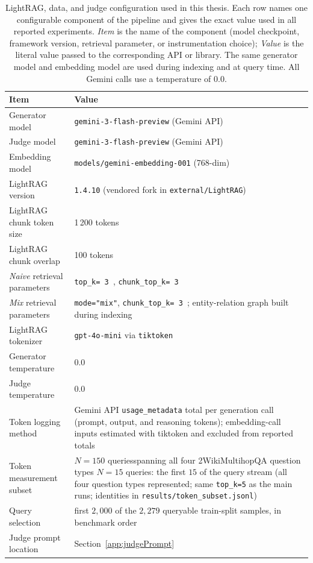\documentclass[english, bibtex]{kththesis}               %
\numberwithin{listing}{chapter}
\providecommand{\DIFaddtex}[1]{{\protect\color{blue} \sf #1}} %
\providecommand{\DIFdeltex}[1]{{\protect\color{red} \scriptsize #1}} %
\providecommand{\DIFaddFL}[1]{\DIFadd{#1}} %
\providecommand{\DIFdelFL}[1]{\DIFdel{#1}} %
\providecommand{\DIFaddbeginFL}{} %
\providecommand{\DIFaddendFL}{} %
\providecommand{\DIFdelbeginFL}{} %
\providecommand{\DIFdelendFL}{} %
\providecommand{\DIFadd}[1]{\texorpdfstring{\DIFaddtex{#1}}{#1}} %
\providecommand{\DIFdel}[1]{\texorpdfstring{\DIFdeltex{#1}}{}} %
\begin{document}
\begin{table}[!ht]
\centering
\caption{LightRAG, data, and judge configuration used in this thesis. Each row names one configurable component of the pipeline and gives the exact value used in all reported experiments. \emph{Item} is the name of the component (model checkpoint, framework version, retrieval parameter, or instrumentation choice); \emph{Value} is the literal value passed to the corresponding API or library. The same generator model and embedding model are used during indexing and at query time. All Gemini calls use a temperature of $0.0$.}
\label{tab:lightragDataJudgeConfig}
\begin{tabularx}{\textwidth}{p{}|X}
\textbf{Item} & \textbf{Value} \\
\hline
Generator model & \texttt{gemini-3-flash-preview} (Gemini API) \\
Judge model & \texttt{gemini-3-flash-preview} (Gemini API) \\
Embedding model & \texttt{models/gemini-embedding-001} (768-dim) \\
LightRAG version & \texttt{1.4.10} (vendored fork in \texttt{external/LightRAG}) \\
LightRAG chunk token size & 1\,200 tokens \\
LightRAG chunk overlap & 100 tokens \\
\emph{Naive} retrieval parameters & \texttt{top\_k=\DIFdelbeginFL \DIFdelFL{3}\DIFdelendFL \DIFaddbeginFL \DIFaddFL{5}\DIFaddendFL }, \texttt{chunk\_top\_k=\DIFdelbeginFL \DIFdelFL{3}\DIFdelendFL \DIFaddbeginFL \DIFaddFL{5}\DIFaddendFL } \\
\emph{Mix} retrieval parameters & \texttt{mode="mix"}, \texttt{chunk\_top\_k=\DIFdelbeginFL \DIFdelFL{3}\DIFdelendFL \DIFaddbeginFL \DIFaddFL{5}\DIFaddendFL }; entity-relation graph built during indexing \\
LightRAG tokenizer & \texttt{gpt-4o-mini} via \texttt{tiktoken} \\
Generator temperature & 0.0 \\
Judge temperature & 0.0 \\
Token logging method & Gemini API \texttt{usage\_metadata} total per generation call (prompt, output, and reasoning tokens); embedding-call inputs estimated with tiktoken and excluded from reported totals \\
Token measurement subset & \DIFdelbeginFL \DIFdelFL{\(N = 150\) queriesspanning all four 2WikiMultihopQA question types }\DIFdelendFL \DIFaddbeginFL \DIFaddFL{\(N = 15\) queries: the first $15$ of the query stream (all four question types represented; same \texttt{top\_k=5} as the main runs; identities in \texttt{results/token\_subset.jsonl}) }\DIFaddendFL \\
\DIFaddbeginFL \DIFaddFL{Query selection }& \DIFaddFL{first $2{,}000$ of the $2{,}279$ queryable train-split samples, in benchmark order }\\
\DIFaddendFL Judge prompt location & Section~\ref{app:judgePrompt} \\
\end{tabularx}
\end{table}
\end{document}

